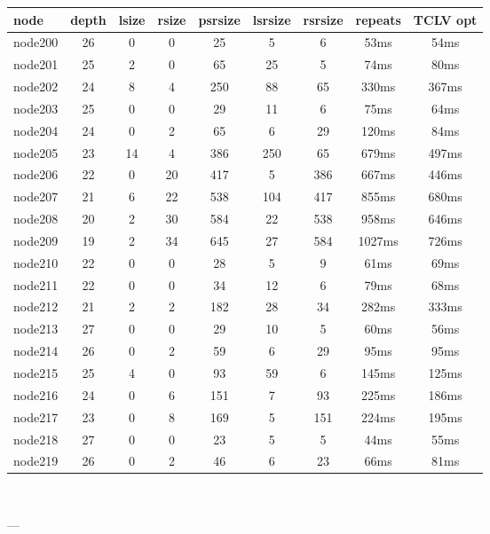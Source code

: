 \begin{tabular}{|l|c|c|c|c|c|c|c|c|}
\hline node & depth & lsize & rsize & psrsize & lsrsize & rsrsize   & repeats & TCLV opt\\
    \hline node200 & 26 & 0 & 0 & 25 & 5 & 6 & 53ms & 54ms\\
    \hline node201 & 25 & 2 & 0 & 65 & 25 & 5 & 74ms & 80ms\\
    \hline node202 & 24 & 8 & 4 & 250 & 88 & 65 & 330ms & 367ms\\
    \hline node203 & 25 & 0 & 0 & 29 & 11 & 6 & 75ms & 64ms\\
    \hline node204 & 24 & 0 & 2 & 65 & 6 & 29 & 120ms & 84ms\\
    \hline node205 & 23 & 14 & 4 & 386 & 250 & 65 & 679ms & 497ms\\
    \hline node206 & 22 & 0 & 20 & 417 & 5 & 386 & 667ms & 446ms\\
    \hline node207 & 21 & 6 & 22 & 538 & 104 & 417 & 855ms & 680ms\\
    \hline node208 & 20 & 2 & 30 & 584 & 22 & 538 & 958ms & 646ms\\
    \hline node209 & 19 & 2 & 34 & 645 & 27 & 584 & 1027ms & 726ms\\
    \hline node210 & 22 & 0 & 0 & 28 & 5 & 9 & 61ms & 69ms\\
    \hline node211 & 22 & 0 & 0 & 34 & 12 & 6 & 79ms & 68ms\\
    \hline node212 & 21 & 2 & 2 & 182 & 28 & 34 & 282ms & 333ms\\
    \hline node213 & 27 & 0 & 0 & 29 & 10 & 5 & 60ms & 56ms\\
    \hline node214 & 26 & 0 & 2 & 59 & 6 & 29 & 95ms & 95ms\\
    \hline node215 & 25 & 4 & 0 & 93 & 59 & 6 & 145ms & 125ms\\
    \hline node216 & 24 & 0 & 6 & 151 & 7 & 93 & 225ms & 186ms\\
    \hline node217 & 23 & 0 & 8 & 169 & 5 & 151 & 224ms & 195ms\\
    \hline node218 & 27 & 0 & 0 & 23 & 5 & 5 & 44ms & 55ms\\
    \hline node219 & 26 & 0 & 2 & 46 & 6 & 23 & 66ms & 81ms\\

\hline
\end{tabular} \

---


